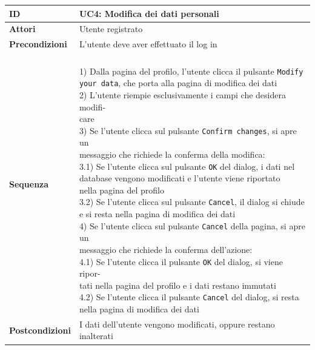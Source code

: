 \documentclass[12pt,a4paper]{article}
\begin{document}
	\begin{tabular}{|l|l|}
		\hline
		\textbf{ID} & UC4: Modifica dei dati personali\\
		\hline
		\textbf{Attori} & Utente registrato\\
		\hline
		\textbf{Precondizioni} & \makecell[l]{L'utente deve aver effettuato il log in\vspace{5px}\\}\\
		\hline
		\textbf{Sequenza} & \makecell[l]{\\1) Dalla pagina del profilo, l'utente clicca il pulsante \texttt{Modify} \\ \texttt{your data}, che porta alla pagina di modifica dei dati\vspace{5px}\\
		2) L'utente riempie esclusivamente i campi che desidera modifi-\\care\vspace{5px}\\
		3) Se l'utente clicca sul pulsante \texttt{Confirm changes}, si apre un \\messaggio che richiede la conferma della modifica:\vspace{5px}\\
		\hspace{11px} 3.1) Se l'utente clicca sul pulsante \texttt{OK} del dialog, i dati nel\\ 
		\hspace{38px}database vengono modificati e l'utente viene riportato \\
		\hspace{38px}nella pagina del profilo\vspace{5px}\\
		\hspace{11px} 3.2) Se l'utente clicca sul pulsante \texttt{Cancel}, il dialog si chiude\\
		\hspace{38px}e si resta nella pagina di modifica dei dati\vspace{5px}\\
		4) Se l'utente clicca sul pulsante \texttt{Cancel} della pagina, si apre un\\
		messaggio che richiede la conferma dell'azione:\vspace{5px}\\
		\hspace{11px} 4.1) Se l'utente clicca il pulsante \texttt{OK} del dialog, si viene ripor-\\
		\hspace{38px}tati nella pagina del profilo e i dati restano immutati\vspace{5px}\\
		\hspace{11px} 4.2) Se l'utente clicca il pulsante \texttt{Cancel} del dialog, si resta \\
		\hspace{38px} nella pagina di modifica dei dati\vspace{5px}}\\
		\hline
		\textbf{Postcondizioni} & I dati dell'utente vengono modificati, oppure restano inalterati\\
		\hline
	\end{tabular}
\end{document}
